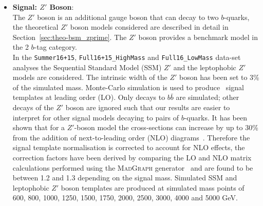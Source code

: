 \begin{itemize}[leftmargin=*]
\item\textbf{Signal: $Z'$ Boson}:  \vspace{1em} \\
  The $Z'$ boson is an additional gauge boson that can decay to two $b$-quarks,
  the theoretical $Z'$ boson models considered are
  described in detail in Section~\ref{sec:theo-bsm_zprime}.
  The $Z'$ boson provides a benchmark model in the 2 $b$-tag category.\\

  In the \verb|Summer16+15|, \verb|Full16+15_HighMass| and \verb|Full16_LowMass| data-set analyses
  the Sequential Standard Model (SSM) $Z'$ and the leptophobic $Z'$ models are considered.
  The intrinsic width of the $Z'$ boson has been set to 3\% of the simulated mass.
  Monte-Carlo simulation is used to produce \mjj~signal templates at leading order (LO).
  Only decays to $b\bar{b}$ are simulated;
  other decays of the  $Z'$ boson are ignored such that our
  results are easier to interpret for other signal models decaying to pairs of $b$-quarks.
  It has been shown that for a $Z'$-boson model the cross-sections can increase by up to 30\%
  from the addition of next-to-leading order (NLO) diagrams~\cite{evt-NLO_zprime}.
  Therefore the signal template normalisation is corrected to account for NLO effects,
  the correction factors have been derived by comparing
  the LO and NLO matrix calculations performed using the \textsc{MadGraph} generator~\cite{dibjet-madGraph}
  and are found to be between 1.2 and 1.3 depending on the signal mass.
  Simulated SSM and leptophobic $Z'$ boson templates are produced at simulated mass points of
  600, 800, 1000, 1250, 1500, 1750, 2000, 2500, 3000, 4000 and 5000 GeV.\\
  

\end{itemize}
